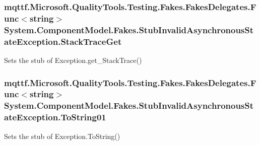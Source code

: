 \hypertarget{class_system_1_1_component_model_1_1_fakes_1_1_stub_invalid_asynchronous_state_exception_a64fa5774aaa733437e9cba01bd1bcfc0}{
\subsubsection[{Stack\-Trace\-Get}]{\setlength{\rightskip}{0pt plus 5cm}mqttf.\-Microsoft.\-Quality\-Tools.\-Testing.\-Fakes.\-Fakes\-Delegates.\-Func$<$string$>$ System.\-Component\-Model.\-Fakes.\-Stub\-Invalid\-Asynchronous\-State\-Exception.\-Stack\-Trace\-Get}}\label{class_system_1_1_component_model_1_1_fakes_1_1_stub_invalid_asynchronous_state_exception_a64fa5774aaa733437e9cba01bd1bcfc0}


Sets the stub of Exception.\-get\-\_\-\-Stack\-Trace()

\hypertarget{class_system_1_1_component_model_1_1_fakes_1_1_stub_invalid_asynchronous_state_exception_acade0d8133e1490a3c74ba3c42279f9d}{
\subsubsection[{To\-String01}]{\setlength{\rightskip}{0pt plus 5cm}mqttf.\-Microsoft.\-Quality\-Tools.\-Testing.\-Fakes.\-Fakes\-Delegates.\-Func$<$string$>$ System.\-Component\-Model.\-Fakes.\-Stub\-Invalid\-Asynchronous\-State\-Exception.\-To\-String01}}\label{class_system_1_1_component_model_1_1_fakes_1_1_stub_invalid_asynchronous_state_exception_acade0d8133e1490a3c74ba3c42279f9d}


Sets the stub of Exception.\-To\-String()



